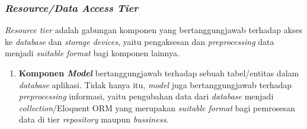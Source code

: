 	\subsubsection{\textit{Resource/Data Access Tier}}
	\textit{Resource tier} adalah gabungan komponen yang bertanggungjawab terhadap akses ke \textit{database} dan \textit{storage devices}, yaitu pengaksesan dan \textit{preprocessing} data menjadi \textit{suitable format} bagi komponen lainnya.
	\begin{enumerate}
		\item \textbf{Komponen \textit{Model}} bertanggungjawab terhadap sebuah tabel/entitas dalam \textit{database} aplikasi. Tidak hanya itu, \textit{model} juga bertanggungjawab terhadap \textit{preprocessing} informasi, yaitu pengubahan data dari \textit{database} menjadi \textit{collection}/Eloquent ORM yang merupakan \textit{suitable format} bagi pemrosesan data di tier \textit{repository} maupun \textit{bussiness}.
	\end{enumerate}		
		
	

	
	
	